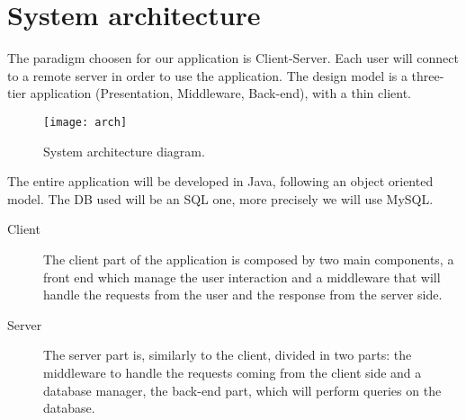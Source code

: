 \section{System architecture}

The paradigm choosen for our application is Client-Server. Each user will
connect to a remote server in order to use the application. The design model is
a three-tier application (Presentation, Middleware, Back-end), with a thin
client.

\begin{figure}[hpb]
	\centering
	\texttt{[image: arch]}
	\caption{System architecture diagram.}
	\label{fig:arch}
\end{figure}

The entire application will be developed in Java, following an object oriented
model. The DB used will be an SQL one, more precisely we will use MySQL.

\begin{description}
	\item[Client] The client part of the application is composed by two main
		components, a front end which manage the user interaction and a
		middleware that will handle the requests from the user and the
		response from the server side.
	\item[Server] The server part is, similarly to the client, divided in
		two parts: the middleware to handle the requests coming from the
		client side and a database manager, the back-end part, which
		will perform queries on the database.
\end{description}
